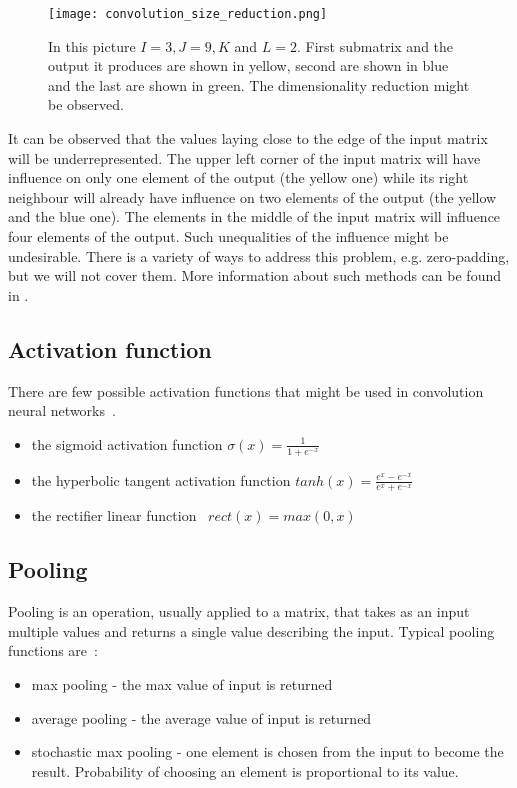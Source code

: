 \documentclass[a4paper,10pt]{report}
\begin{document}
	  
	  \begin{figure}[h!]
	    \centering
	    \texttt{[image: convolution\_size\_reduction.png]}
	    \caption{In this picture $I = 3, J = 9, K$ and $L = 2$. First submatrix and the output it produces are shown in yellow, second are shown in blue and the last are shown in green. The dimensionality reduction might be observed.}
	    \label{fig:convolution_size_reduction}
	  \end{figure} 
	  
	  It can be observed that the values laying close to the edge of the input matrix will be underrepresented. The upper left corner of the input matrix will have influence on only one element of the output (the yellow one) while its right neighbour will already have influence on two elements of the output (the yellow and the blue one). The elements in the middle of the input matrix will influence four elements of the output. Such unequalities of the influence might be undesirable. There is a variety of ways to address this problem, e.g. zero-padding, but we will not cover them. More information about such methods can be found in \cite{Bengio}. 
	  
	\subsection{Activation function}\label{sec:ACTIVATION_FUNCTIONS}
	  There are few possible activation functions that might be used in convolution neural networks~\cite{DUTCH}.
	  \begin{itemize}
	   \item the sigmoid activation function $\sigma(x) = \frac{1}{1 + e^{-x}}$
	   \item the hyperbolic tangent activation function $tanh(x) = \frac{e^{x} - e^{-x}}{e^{x} + e^{-x}}$
	   \item the rectifier linear function~\cite{GLOROT_BENGIO} $rect(x) = max(0,x)$
	  \end{itemize}

	
	\subsection{Pooling}
	  Pooling is an operation, usually applied to a matrix, that takes as an input multiple values and returns a single value describing the input. Typical pooling functions are~\cite{DUTCH}:
	  \begin{itemize}
	    \item max pooling - the max value of input is returned
	    \item average pooling - the average value of input is returned
	    \item stochastic max pooling - one element is chosen from the input to become the result. Probability of choosing an element is proportional to its value.~\cite{ZEILER} 
	  \end{itemize}
	  
\end{document}

